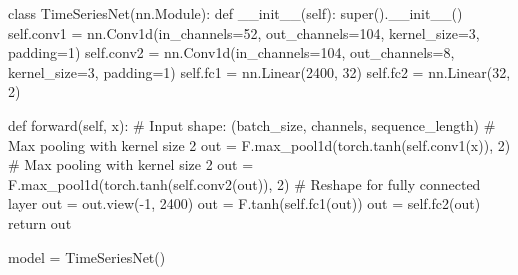 \begin{mypython}[float={h}, caption=Red convolucional]
class TimeSeriesNet(nn.Module):
  def __init__(self):
      super().__init__()
      self.conv1 = nn.Conv1d(in_channels=52, out_channels=104, kernel_size=3, padding=1)
      self.conv2 = nn.Conv1d(in_channels=104, out_channels=8, kernel_size=3, padding=1)
      self.fc1 = nn.Linear(2400, 32)
      self.fc2 = nn.Linear(32, 2)

  def forward(self, x):
      # Input shape: (batch_size, channels, sequence_length)
      # Max pooling with kernel size 2
      out = F.max_pool1d(torch.tanh(self.conv1(x)), 2)  
      # Max pooling with kernel size 2
      out = F.max_pool1d(torch.tanh(self.conv2(out)), 2)
      # Reshape for fully connected layer
      out = out.view(-1, 2400)  
      out = F.tanh(self.fc1(out))
      out = self.fc2(out)
      return out

model = TimeSeriesNet()
\end{mypython}
